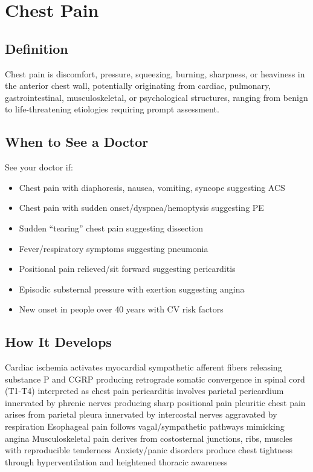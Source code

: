 \chapter{Chest Pain}

\section*{Definition}
Chest pain is discomfort, pressure, squeezing, burning, sharpness, or heaviness in the anterior chest wall, potentially originating from cardiac, pulmonary, gastrointestinal, musculoskeletal, or psychological structures, ranging from benign to life-threatening etiologies requiring prompt assessment.

\section*{When to See a Doctor}
See your doctor if:
\begin{itemize}
  \item Chest pain with diaphoresis, nausea, vomiting, syncope suggesting ACS
  \item Chest pain with sudden onset/dyspnea/hemoptysis suggesting PE
  \item Sudden ``tearing'' chest pain suggesting dissection
  \item Fever/respiratory symptoms suggesting pneumonia
  \item Positional pain relieved/sit forward suggesting pericarditis
  \item Episodic substernal pressure with exertion suggesting angina
  \item New onset in people over 40 years with CV risk factors
\end{itemize}

\section*{How It Develops}
Cardiac ischemia activates myocardial sympathetic afferent fibers releasing substance P and CGRP producing retrograde somatic convergence in spinal cord (T1-T4) interpreted as chest pain pericarditis involves parietal pericardium innervated by phrenic nerves producing sharp positional pain pleuritic chest pain arises from parietal pleura innervated by intercostal nerves aggravated by respiration Esophageal pain follows vagal/sympathetic pathways mimicking angina Musculoskeletal pain derives from costosternal junctions, ribs, muscles with reproducible tenderness Anxiety/panic disorders produce chest tightness through hyperventilation and heightened thoracic awareness

